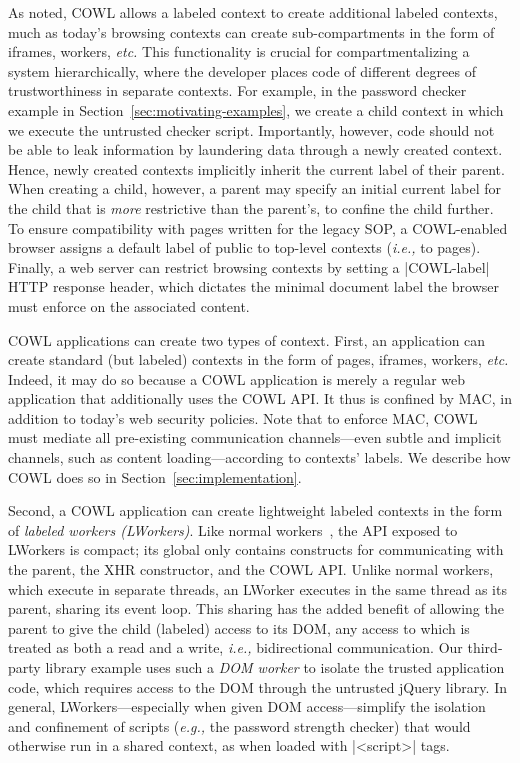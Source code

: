 As noted, COWL allows a labeled context to create additional labeled contexts,
much as today's browsing contexts can create sub-compartments
in the form of iframes, workers, \emph{etc.}
%
This functionality is crucial for compartmentalizing a system
hierarchically, where the developer places code of different degrees
of trustworthiness in separate contexts.
%
For example, in the password checker example in
Section~\ref{sec:motivating-examples}, we create a child context in
which we execute the untrusted checker script.
%
Importantly, however, code should not be able to leak information by
laundering data through a newly created context.
%
Hence, newly created contexts implicitly inherit the current label of
their parent.
%
When creating a child, however, a parent may specify an initial
current label for the child that is {\em more} restrictive than the
parent's, to confine the child further.
%
To ensure compatibility with pages written for the legacy SOP, a
COWL-enabled browser assigns a default label of public to top-level
contexts (\emph{i.e.,} to pages).
%
Finally, a web server can restrict browsing contexts by setting a
\js|COWL-label| HTTP response header, which dictates the minimal
document label the browser must enforce on the associated content.

COWL applications can create two types of context.
%
First, an application can create standard (but labeled) contexts in
the form of pages, iframes, workers, \emph{etc.}
%
Indeed, it may do so because a COWL application is merely a regular
web application that additionally uses the COWL API. It thus is
confined by MAC, in addition to today's web security policies.
%
Note that to enforce MAC, COWL must mediate all pre-existing
communication channels---even subtle and implicit channels, such as
content loading---according to contexts' labels.
%
We describe how COWL does so in Section~\ref{sec:implementation}.

Second, a COWL application can create lightweight labeled contexts in
the form of \emph{labeled workers (LWorkers)}.
%
Like normal workers~\cite{workers}, the API exposed to LWorkers is
compact; its global only contains constructs for communicating with
the parent, the XHR constructor, and the COWL API.
%
Unlike normal workers, which execute in separate threads, an LWorker
executes in the same thread as its parent, sharing its event loop.
%
This sharing has the added benefit of allowing the parent to give the
child (labeled) access to its DOM, any access to which is treated as
both a read and a write, \emph{i.e.,} bidirectional communication.
%
Our third-party library example uses such a \emph{DOM worker} to
isolate the trusted application code, which requires access to the DOM
through the untrusted jQuery library.
%
In general, LWorkers---especially when given DOM access---simplify the
isolation and confinement of scripts (\emph{e.g.,} the password strength
checker) that would otherwise run in a shared context, as when loaded
with \js|<script>| tags.


